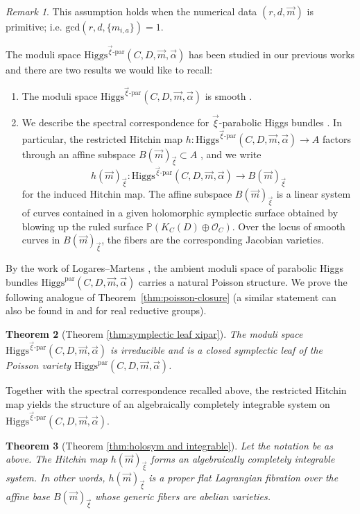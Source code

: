 \documentclass[11pt]{amsart}
\theoremstyle{plain}
\newtheorem{theorem}{Theorem}[section]
\theoremstyle{definition}
\theoremstyle{remark}
\newtheorem{remark}[theorem]{Remark}
\newcommand{\Higgs}{\mathrm{Higgs}}
\def\O{\mathcal{O}}
\def\bb{\mathbb}
\def\vxi{\vec{\xi}}
\def\vm{\vec{m}}
\begin{document}
\begin{remark}\label{rem:assump}
    This assumption holds when the numerical data $(r,d,\vm)$ is primitive; i.e. $\mathrm{gcd}(r,d,\{m_{i,a}\})=1$. 
\end{remark}

 The moduli space $\Higgs^{\vec\xi\text{-par}}(C,D,\vec m,\vec\alpha)$ has been studied in our previous works \cite{LeeLee2024, LeeLee2025} and there are two results we would like to recall:
\begin{enumerate}[label=\textup{(\arabic*)}]
	\item The moduli space $\Higgs^{\vec\xi\text{-par}}(C,D,\vec m,\vec\alpha)$ is smooth \cite[Theorem 2.6]{LeeLee2024}.
    \item We describe the spectral correspondence for $\vxi$-parabolic Higgs bundles \cite[Theorem 1.2]{LeeLee2025}. In particular, the restricted Hitchin map $h:\Higgs^{\vec\xi\text{-par}}(C,D,\vec m,\vec\alpha) \to A$  factors through an affine subspace $B(\vm)_{\vxi}\subset A$ \cite[Corollary 1.4]{LeeLee2025}, and we write 
    \[h(\vm)_{\vxi}: \Higgs^{\vec\xi\text{-par}}(C,D,\vec m,\vec\alpha)\to B(\vm)_{\vxi}\]
    for the induced Hitchin map. The affine subspace $B(\vm)_{\vxi}$ is a linear system of curves contained in a given holomorphic symplectic surface obtained by blowing up the ruled surface $\bb{P}(K_C(D)\oplus\O_C)$. Over the locus of smooth curves in $B(\vm)_{\vxi}$, the  fibers are the corresponding Jacobian varieties. 
    
\end{enumerate} 
\noindent By the work of Logares--Martens \cite{logaresMartens}, the ambient moduli space of parabolic Higgs bundles $\Higgs^{\mathrm{par}}(C,D,\vec m,\vec\alpha)$ carries a natural Poisson
structure. We prove the following analogue of
Theorem~\ref{thm:poisson-closure} (a similar statement can also be found in \cite[Section 3.2.4]{logaresMartens} and \cite[Proposition 7.1]{BGPM2020} for real reductive groups).  
\begin{theorem}[Theorem \ref{thm:symplectic leaf xipar}]
     The moduli space $\Higgs^{\vec\xi\text{-par}}(C,D,\vec m,\vec\alpha)$ is irreducible and is a closed symplectic leaf of the Poisson variety $\Higgs^{\text{par}}(C,D,\vec m,\vec\alpha)$.
\end{theorem}
Together with the spectral correspondence recalled above, the restricted Hitchin map yields the structure of an algebraically completely integrable system on $\Higgs^{\vec\xi\text{-par}}(C,D,\vec m,\vec\alpha)$. 
\begin{theorem}[Theorem \ref{thm:holosym and integrable}]\label{thm:xipar}
     Let the notation be as above. The Hitchin map $h(\vm)_{\vxi}$ forms an algebraically completely integrable system. In other words, $h(\vm)_{\vxi}$ is a proper flat Lagrangian fibration over the affine base $B(\vm)_{\vxi}$ whose generic fibers are abelian varieties. 
    
\end{theorem}
\end{document}

